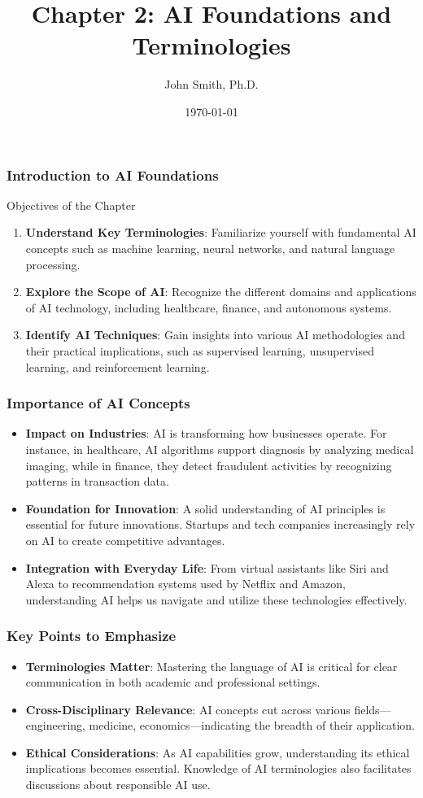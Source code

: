 \documentclass[aspectratio=169]{beamer}
\title[AI Foundations]{Chapter 2: AI Foundations and Terminologies}
\author[J. Smith]{John Smith, Ph.D.}
\institute[University Name]{
  Department of Computer Science\\
  University Name\\
  \vspace{0.3cm}
  Email: email@university.edu\\
  Website: www.university.edu
}
\date{\today}
\begin{document}
\frame{\titlepage}

\begin{frame}[fragile]
    \frametitle{Introduction to AI Foundations}
    \begin{block}{Objectives of the Chapter}
        \begin{enumerate}
            \item \textbf{Understand Key Terminologies}: Familiarize yourself with fundamental AI concepts such as machine learning, neural networks, and natural language processing.
            \item \textbf{Explore the Scope of AI}: Recognize the different domains and applications of AI technology, including healthcare, finance, and autonomous systems.
            \item \textbf{Identify AI Techniques}: Gain insights into various AI methodologies and their practical implications, such as supervised learning, unsupervised learning, and reinforcement learning.
        \end{enumerate}
    \end{block}
\end{frame}

\begin{frame}[fragile]
    \frametitle{Importance of AI Concepts}
    \begin{itemize}
        \item \textbf{Impact on Industries}: AI is transforming how businesses operate. For instance, in healthcare, AI algorithms support diagnosis by analyzing medical imaging, while in finance, they detect fraudulent activities by recognizing patterns in transaction data.
        \item \textbf{Foundation for Innovation}: A solid understanding of AI principles is essential for future innovations. Startups and tech companies increasingly rely on AI to create competitive advantages.
        \item \textbf{Integration with Everyday Life}: From virtual assistants like Siri and Alexa to recommendation systems used by Netflix and Amazon, understanding AI helps us navigate and utilize these technologies effectively.
    \end{itemize}
\end{frame}

\begin{frame}[fragile]
    \frametitle{Key Points to Emphasize}
    \begin{itemize}
        \item \textbf{Terminologies Matter}: Mastering the language of AI is critical for clear communication in both academic and professional settings.
        \item \textbf{Cross-Disciplinary Relevance}: AI concepts cut across various fields—engineering, medicine, economics—indicating the breadth of their application.
        \item \textbf{Ethical Considerations}: As AI capabilities grow, understanding its ethical implications becomes essential. Knowledge of AI terminologies also facilitates discussions about responsible AI use.
    \end{itemize}
\end{frame}
\end{document}
